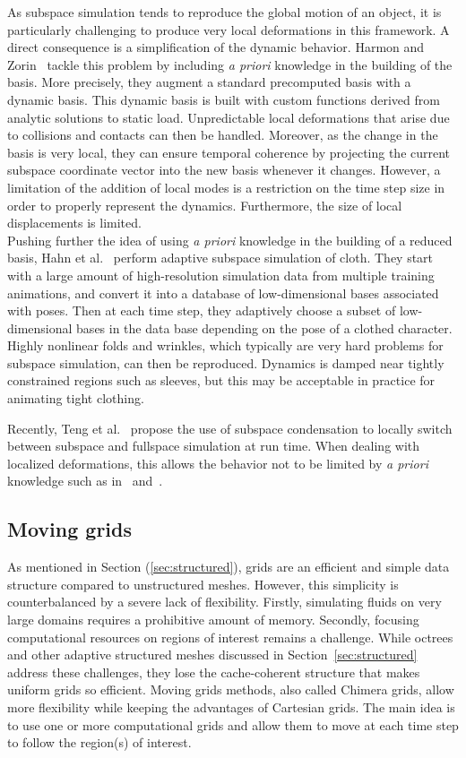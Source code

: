 As subspace simulation tends to reproduce the global motion of an object, it is particularly challenging to produce very local deformations in this framework. A direct consequence is a simplification of the dynamic behavior. Harmon and Zorin~\cite{Harmon2013} tackle this problem by including \textit{a priori} knowledge in the building of the basis. More precisely, they augment a standard precomputed basis with a dynamic basis. This dynamic basis is built with custom functions derived from analytic solutions to static load. Unpredictable local deformations that arise due to collisions and contacts can then be handled. Moreover, as the change in the basis is very local, they can ensure temporal coherence by projecting the current subspace coordinate vector into the new basis whenever it changes. However, a limitation of the addition of local modes is a restriction on the time step size in order to properly represent the dynamics. Furthermore, the size of local displacements is limited.
\\
Pushing further the idea of using \textit{a priori} knowledge in the building of a reduced basis, Hahn et al.~\cite{Hahn2014} perform adaptive subspace simulation of cloth. They start with a large amount of high-resolution simulation data from multiple training animations, and convert it into a database of low-dimensional bases associated with poses. Then at each time step, they adaptively choose a subset of low-dimensional bases in the data base depending on the pose of a clothed character.
Highly nonlinear folds and wrinkles, which typically are very hard problems for subspace simulation, can then be reproduced. Dynamics is damped near tightly constrained regions such as sleeves, but this may be acceptable in practice for animating tight clothing.

Recently, Teng et al.~\cite{Teng2015} propose the use of subspace condensation to locally switch between subspace and fullspace simulation at run time. When dealing with localized deformations, this allows the behavior not to be limited by \textit{a priori} knowledge such as in~\cite{Harmon2013} and~\cite{Hahn2014}.

\subsection{Moving grids}
\label{sec:movingMesh}
As mentioned in Section (\ref{sec:structured}), grids are an efficient and simple data structure compared to unstructured meshes. However, this simplicity is counterbalanced by a severe lack of flexibility. Firstly, simulating fluids on very large domains requires a prohibitive amount of memory. Secondly, focusing computational resources on regions of interest remains a challenge.
While octrees and other adaptive structured meshes discussed in Section~\ref{sec:structured} address these challenges, they lose the cache-coherent structure that makes uniform grids so efficient.
Moving grids methods, also called Chimera grids, allow more flexibility while keeping the advantages of Cartesian grids. The main idea is to use one or more computational grids and allow them to move at each time step to follow the region(s) of interest.

